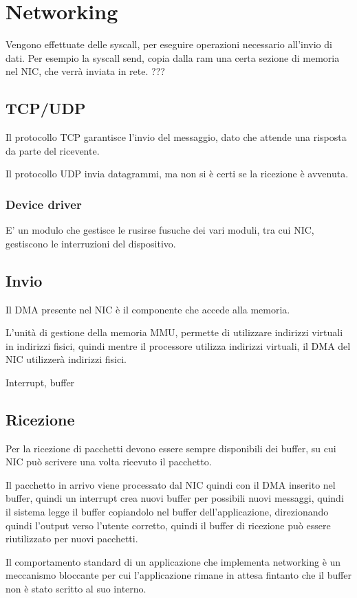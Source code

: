 \section{Networking}
Vengono effettuate delle syscall, per eseguire operazioni necessario all'invio di dati.
Per esempio la syscall send, copia dalla ram una certa sezione di memoria nel NIC,
che verrà inviata in rete.
???

\subsection{TCP/UDP}
Il protocollo TCP garantisce l'invio del messaggio, dato che attende una risposta
da parte del ricevente.

Il protocollo UDP invia datagrammi, ma non si è certi se la ricezione è avvenuta.
\subsubsection{Device driver}
E' un modulo che gestisce le rusirse fusuche dei vari moduli, tra cui NIC,
gestiscono le interruzioni del dispositivo.

\subsection{Invio}
Il DMA presente nel NIC è il componente che accede alla memoria.

L'unità di gestione della memoria MMU,
permette di utilizzare indirizzi virtuali in indirizzi fisici,
quindi mentre il processore utilizza indirizzi virtuali,
il DMA del NIC utilizzerà indirizzi fisici.

Interrupt, buffer
\subsection{Ricezione}
Per la ricezione di pacchetti devono essere sempre disponibili dei buffer,
su cui NIC può scrivere una volta ricevuto il pacchetto.

Il pacchetto in arrivo viene processato dal NIC quindi con il DMA inserito nel buffer,
quindi un interrupt crea nuovi buffer per possibili nuovi messaggi,
quindi il sistema legge il buffer copiandolo nel buffer dell'applicazione,
direzionando quindi l'output verso l'utente corretto,
quindi il buffer di ricezione può essere riutilizzato per nuovi pacchetti.

Il comportamento standard di un applicazione che implementa networking è un
meccanismo bloccante per cui l'applicazione rimane in attesa fintanto che il
buffer non è stato scritto al suo interno.

